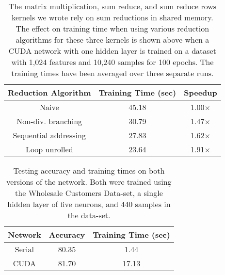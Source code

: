 \documentclass[11pt,a4paper]{article}
\begin{document}
\begin{table} 
\centering
\small
  \begin{tabular}{|c||c|c|}
    \hline
    Reduction Algorithm & Training Time (sec) & Speedup\\
    \hline
    Naive & 45.18 & 1.00$\times$\\ 
    \hline
    Non-div. branching & 30.79 & 1.47$\times$\\ 
    \hline
    Sequential addressing & 27.83 & 1.62$\times$\\ 
    \hline
    Loop unrolled & 23.64 & 1.91$\times$\\ 
    \hline
  \end{tabular} \caption{ The matrix multiplication, sum reduce, and sum reduce rows kernels we wrote rely on sum reductions in shared memory. The effect on training time when using various reduction algorithms for these three kernels is shown above when a CUDA network with one hidden layer is trained on a dataset with 1,024 features and 10,240 samples for 100 epochs. The training times have been averaged over three separate runs. }\label{tab:reduction_algos}
\end{table}

\begin{table} 
\centering
\small
  \begin{tabular}{|c||c|c|}
    \hline
    Network & Accuracy & Training Time (sec)\\
    \hline
    Serial & 80.35 & 1.44\\ 
    \hline
    CUDA & 81.70 & 17.13\\ 
    \hline

  \end{tabular} \caption{ Testing accuracy and training times on both versions of the network. Both were trained using the Wholesale Customers Data-set, a single hidden layer of five neurons, and 440 samples in the data-set. }\label{tab:acc}
\end{table}

\end{document}

